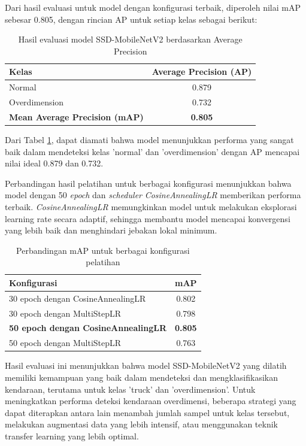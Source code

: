 Dari hasil evaluasi untuk model dengan konfigurasi terbaik, diperoleh nilai mAP sebesar 0.805, dengan rincian AP untuk setiap kelas sebagai berikut:

\begin{table}[htbp]
  \centering
  \caption{Hasil evaluasi model SSD-MobileNetV2 berdasarkan Average Precision}
  \label{tab:ap_results}
  \begin{tabular}{|l|c|}
    \hline
    \rowcolor[HTML]{C0C0C0}
    \textbf{Kelas} & \textbf{Average Precision (AP)} \\
    \hline
    Normal & 0.879 \\
    \hline
    Overdimension & 0.732 \\
    \hline
    \textbf{Mean Average Precision (mAP)} & \textbf{0.805} \\
    \hline
  \end{tabular}
\end{table}

Dari Tabel \ref{tab:ap_results}, dapat diamati bahwa model menunjukkan performa yang sangat baik dalam mendeteksi kelas 'normal' dan 'overdimension' dengan AP mencapai nilai ideal 0.879 dan 0.732. 

Perbandingan hasil pelatihan untuk berbagai konfigurasi menunjukkan bahwa model dengan 50 \emph{epoch} dan \emph{scheduler} \emph{CosineAnnealingLR} memberikan performa terbaik. \emph{CosineAnnealingLR} memungkinkan model untuk melakukan eksplorasi learning rate secara adaptif, sehingga membantu model mencapai konvergensi yang lebih baik dan menghindari jebakan lokal minimum.

\begin{table}[htbp]
  \centering
  \caption{Perbandingan mAP untuk berbagai konfigurasi pelatihan}
  \label{fig:map_comparison}
  \begin{tabular}{|l|c|}
    \hline
    \rowcolor[HTML]{C0C0C0}
    \textbf{Konfigurasi} & \textbf{mAP} \\
    \hline
    30 epoch dengan CosineAnnealingLR & 0.802 \\
    \hline
    30 epoch dengan MultiStepLR & 0.798 \\
    \hline
    \textbf{50 epoch dengan CosineAnnealingLR} & \textbf{0.805} \\
    \hline
    50 epoch dengan MultiStepLR & 0.763 \\
    \hline
  \end{tabular}
\end{table}

Hasil evaluasi ini menunjukkan bahwa model SSD-MobileNetV2 yang dilatih memiliki kemampuan yang baik dalam mendeteksi dan mengklasifikasikan kendaraan, terutama untuk kelas 'truck' dan 'overdimension'. Untuk meningkatkan performa deteksi kendaraan overdimensi, beberapa strategi yang dapat diterapkan antara lain menambah jumlah sampel untuk kelas tersebut, melakukan augmentasi data yang lebih intensif, atau menggunakan teknik transfer learning yang lebih optimal.

